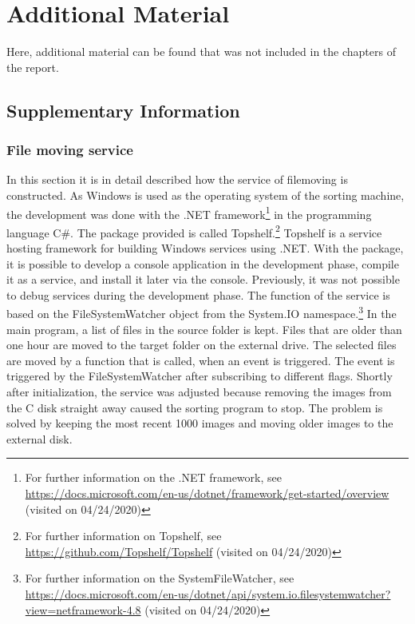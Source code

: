 \section{Additional Material}
\label{apx:AdditionalFigures}

Here, additional material can be found that was not included in the chapters of the report.

\subsection{Supplementary Information}
\label{sec:AddText}

\subsubsection{File moving service}
\label{subsec:FileService}

In this section it is in detail described how the service of filemoving is constructed. As Windows is used as the operating system of the sorting machine, the development was done with the .NET framework\footnote{For further information on the .NET framework, see \url{https://docs.microsoft.com/en-us/dotnet/framework/get-started/overview} (visited on 04/24/2020)} in the programming language C\#. The package provided is called Topshelf.\footnote{For further information on Topshelf, see \url{https://github.com/Topshelf/Topshelf} (visited on 04/24/2020)} Topshelf is a service hosting framework for building Windows services using .NET. With the package, it is possible to develop a console application in the development phase, compile it as a service, and install it later via the console. Previously, it was not possible to debug services during the development phase. The function of the service is based on the FileSystemWatcher object from the System.IO namespace.\footnote{For further information on the SystemFileWatcher, see \url{https://docs.microsoft.com/en-us/dotnet/api/system.io.filesystemwatcher?view=netframework-4.8} (visited on 04/24/2020)} In the main program, a list of files in the source folder is kept. Files that are older than one hour are moved to the target folder on the external drive. The selected files are moved by a function that is called, when an event is triggered. The event is triggered by the FileSystemWatcher after subscribing to different flags. Shortly after initialization, the service was adjusted because removing the images from the C disk straight away caused the sorting program to stop. The problem is solved by keeping the most recent 1000 images and moving older images to the external disk.


